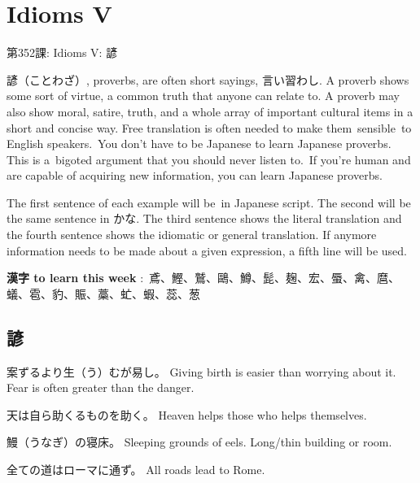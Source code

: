     
\chapter{Idioms V}

\begin{center}
\begin{Large}
第352課: Idioms V: 諺 
\end{Large}
\end{center}
 
\par{ 諺（ことわざ）, proverbs, are often short sayings, 言い習わし. A proverb shows some sort of virtue, a common truth that anyone can relate to. A proverb may also show moral, satire, truth, and a whole array of important cultural items in a short and concise way. Free translation is often needed to make them sensible to English speakers. You don't have to be Japanese to learn Japanese proverbs. This is a bigoted argument that you should never listen to. If you're human and are capable of acquiring new information, you can learn Japanese proverbs. }

\par{ The first sentence of each example will be in Japanese script. The second will be the same sentence in かな. The third sentence shows the literal translation and the fourth sentence shows the idiomatic or general translation. If anymore information needs to be made about a given expression, a fifth line will be used. }

\par{\textbf{漢字 to learn this week }: 鳶、鰹、鷲、鷗、鱒、髭、麹、宏、蜃、禽、麿、蟻、雹、豹、賑、藁、虻、蝦、蕊、葱 }
      
\section{諺}
  
\par{案ずるより生（う）むが易し。 \hfill\break
Giving birth is easier than worrying about it. \hfill\break
Fear is often greater than the danger. }

\par{天は自ら助くるものを助く。 \hfill\break
Heaven helps those who helps themselves. }

\par{鰻（うなぎ）の寝床。 \hfill\break
Sleeping grounds of eels. \hfill\break
Long\slash thin building or room. }

\par{全ての道はローマに通ず。 \hfill\break
All roads lead to Rome. }

